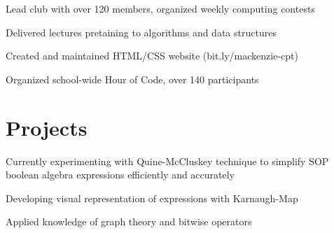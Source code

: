 \documentclass[]{deedy-resume-openfont}
\begin{document}
\begin{minipage}[t]{0.66\textwidth}
\begin{tightemize}
\item Lead club with over 120 members, organized weekly computing contests
\item Delivered lectures pretaining to algorithms and data structures
\item Created and maintained HTML/CSS website (bit.ly/mackenzie-cpt)
\item Organized school-wide Hour of Code, over 140 participants
\end{tightemize}
\sectionsep



\section{Projects}

\begin{tightemize}
\item Currently experimenting with Quine-McCluskey technique to simplify SOP boolean algebra expressions efficiently and accurately\\
\item Developing visual representation of expressions with Karnaugh-Map\\
\item Applied knowledge of graph theory and bitwise operators\\
\end{tightemize}
\sectionsep


\end{minipage}
\end{document}
